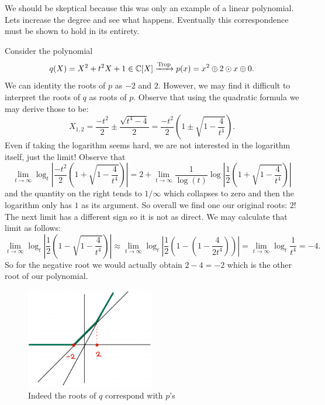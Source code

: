 \documentclass[12pt]{memoir}
\DeclareMathOperator{\Trop}{Trop}
\begin{document}
We should be skeptical because this was only an example of a linear polynomial. Lets increase the degree and see what happens. Eventually this correspondence must be shown to hold in its entirety.

\begin{Ex}
    Consider the polynomial
    $$q(X)=X^2+t^2X+1\in\bC[X]\xrightarrow[]{\Trop}p(x)=x^2\oplus 2\odot x\oplus 0.$$
    We can identity the roots of $p$ as $-2$ and $2$. However, we may find it difficult to interpret the roots of $q$ as roots of $p$. Observe that using the quadratic formula we may derive those to be:
    $$X_{1,2}=\frac{-t^2}{2}\pm\frac{\sqrt{t^4-4}}{2}=\frac{-t^2}{2}\left(1\pm\sqrt{1-\frac{4}{t^4}}\right).$$
    Even if taking the logarithm seems hard, we are not interested in the logarithm itself, just the limit! Observe that 
    $$\lim_{t\to\infty}\log_t\left|\frac{-t^2}{2}\left(1+\sqrt{1-\frac{4}{t^4}}\right)\right|=2+\lim_{t\to\infty}\frac{1}{\log(t)}\log\left|\frac{1}{2}\left(1+\sqrt{1-\frac{4}{t^4}}\right)\right|$$
    and the quantity on the right tends to $1/\infty$ which collapses to zero and then the logarithm only has $1$ as its argument. So overall we find one our original roots: $2$! The next limit has a different sign so it is not as direct. We may calculate that limit as follows:
    $$\lim_{t\to\infty}\log_t\left|\frac{1}{2}\left(1-\sqrt{1-\frac{4}{t^4}}\right)\right|\approx\lim_{t\to\infty}\log_t\left|\frac{1}{2}\left(1-\left(1-\frac{4}{2t^4}\right)\right)\right|=\lim_{t\to\infty}\log_t\frac{1}{t^4}=-4.$$
    So for the negative root we would actually obtain $2-4=-2$ which is the other root of our polynomial.
    \begin{figure}[h!]
        \centering
        \includegraphics[width=0.5\textwidth]{figs/fig4-5CorrespondenceRoots2Example.png}
        \caption{Indeed the roots of $q$ correspond with $p$'s}
        \label{fig:4.5-CorrespondenceRoots2Example}
    \end{figure}
\end{Ex}
\end{document}
